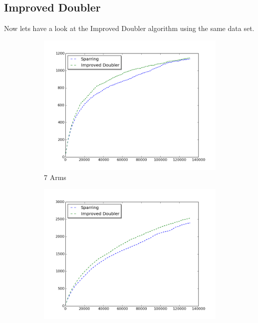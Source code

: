 \documentclass{llncs}
\begin{document}
\newpage
\subsection{Improved Doubler}
Now lets have a look at the Improved Doubler algorithm using the same data set.
\begin{figure}[h!]
\centering
\begin{subfigure}{.5\textwidth}
  \centering
  \includegraphics[scale=0.3]{figures/improved_doubler_sparring_MQ2007_7arms.png}
  \caption{7 Arms}
  \label{fig:sub1}
\end{subfigure}%
\begin{subfigure}{.5\textwidth}
  \centering
  \includegraphics[scale=0.3]{figures/improved_doubler_sparring_MQ2007_16arms.png}

\end{subfigure}
\end{figure}
\end{document}
